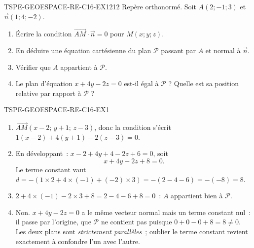 
\begin{exercice}{TSPE-GEOESPACE-RE-C16-EX1}{2}{12}
Repère orthonormé. Soit $A(2;-1;3)$ et $\vec{n}(1;4;-2)$.
\begin{enumerate}
  \item Écrire la condition $\vec{AM}\cdot\vec{n}=0$ pour $M(x;y;z)$.
  \item En déduire une équation cartésienne du plan $\mathcal{P}$ passant par
        $A$ et normal à $\vec{n}$.
  \item Vérifier que $A$ appartient à $\mathcal{P}$.
  \item Le plan d'équation $x+4y-2z=0$ est-il égal à $\mathcal{P}$ ? Quelle
        est sa position relative par rapport à $\mathcal{P}$ ?
\end{enumerate}
\end{exercice}


\begin{corrige}{TSPE-GEOESPACE-RE-C16-EX1}
\begin{enumerate}
  \item $\vec{AM}(x-2;\,y+1;\,z-3)$, donc la condition s'écrit
        $1(x-2)+4(y+1)-2(z-3)=0$.
  \item En développant~: $x-2+4y+4-2z+6=0$, soit
        \[
          x+4y-2z+8=0 .
        \]
        Le terme constant vaut $d=-(1\times2+4\times(-1)+(-2)\times3)
        =-(2-4-6)=-(-8)=8$.
  \item $2+4\times(-1)-2\times3+8=2-4-6+8=0$~: $A$ appartient bien à
        $\mathcal{P}$.
  \item Non. $x+4y-2z=0$ a le même vecteur normal mais un terme constant nul~:
        il passe par l'origine, que $\mathcal{P}$ ne contient pas puisque
        $0+0-0+8=8\neq0$. Les deux plans sont \emph{strictement parallèles}~;
        oublier le terme constant revient exactement à confondre l'un avec
        l'autre.
\end{enumerate}
\end{corrige}
